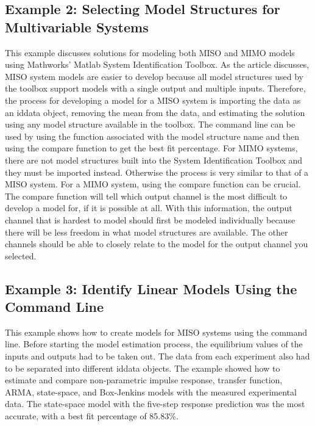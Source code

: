 \documentclass[letterpaper,12pt]{article}   %
\begin{document}
\subsection{Example 2: Selecting Model Structures for Multivariable Systems}
\label{sec:sysID-Example2}
This example discusses solutions for modeling both MISO and MIMO models using Mathworks' Matlab System Identification Toolbox. As the article discusses, MISO system models are easier to develop because all model structures used by the toolbox support models with a single output and multiple inputs. Therefore, the process for developing a model for a MISO system is importing the data as an iddata object, removing the mean from the data, and estimating the solution using any model structure available in the toolbox. The command line can be used by using the function associated with the model structure name and then using the compare function to get the best fit percentage. For MIMO systems, there are not model structures built into the System Identification Toolbox and they must be imported instead. Otherwise the process is very similar to that of a MISO system. For a MIMO system, using the compare function can be crucial. The compare function will tell which output channel is the most difficult to develop a model for, if it is possible at all. With this information, the output channel that is hardest to model should first be modeled individually because there will be less freedom in what model structures are available. The other channels should be able to closely relate to the model for the output channel you selected.


\subsection{Example 3: Identify Linear Models Using the Command Line}
\label{sec:sysID-Example3}
This example shows how to create models for MISO systems using the command line. Before starting the model estimation process, the equilibrium values of the inputs and outputs had to be taken out. The data from each experiment also had to be separated into different iddata objects. The example showed how to estimate and compare non-parametric impulse response, transfer function, ARMA, state-space, and Box-Jenkins models with the measured experimental data. The state-space model with the five-step response prediction was the most accurate, with a best fit percentage of 85.83\%. 
\end{document}
